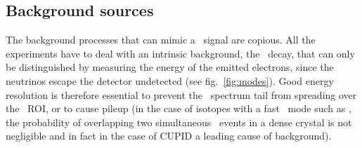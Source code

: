 %

\subsection{Background sources} \label{subsec:bgrsources}
The background processes that can mimic a \bbonu\ signal 
 are copious. All the experiments have to deal with an intrinsic background, the \bbtnu\ decay, that can only be distinguished by measuring the energy of the emitted electrons, since the neutrinos escape the detector undetected (see fig.~\ref{fig:modes}). Good energy resolution is therefore essential to prevent the \bbtnu\ spectrum tail from spreading over the \bbonu\ ROI, or to cause pileup (in the case of isotopes with a fast \bbtnu\ mode such as , the probability of overlapping two simultaneous \bbtnu\ events in a dense crystal is not negligible and in fact in the case of CUPID a leading cause of background).    

